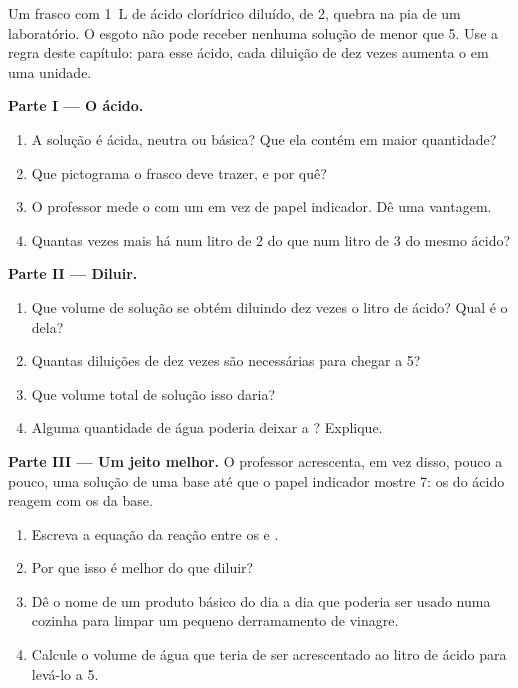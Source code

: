 \begin{problem}
\label{pb:g9:acids-bases-ph:1}
Um frasco com \qty{1}{L} de ácido clorídrico diluído, de  2, quebra na
pia de um laboratório. O esgoto não pode receber nenhuma solução de 
menor que 5. Use a regra deste capítulo: para esse ácido, cada diluição
de dez vezes aumenta o  em uma unidade.

\medskip
\noindent\textbf{Parte I --- O ácido.}
\begin{enumerate}
  \item A solução é ácida, neutra ou básica? Que  ela contém em maior
        quantidade?
  \item Que pictograma o frasco deve trazer, e por quê?
  \item O professor mede o  com um  em vez de papel indicador.
        Dê uma vantagem.
  \item Quantas vezes mais   há num litro de  2 do que num
        litro de  3 do mesmo ácido?
\end{enumerate}

\medskip
\noindent\textbf{Parte II --- Diluir.}
\begin{enumerate}[resume]
  \item Que volume de solução se obtém diluindo dez vezes o litro de
        ácido? Qual é o  dela?
  \item Quantas diluições de dez vezes são necessárias para chegar a
         5?
  \item Que volume total de solução isso daria?
  \item Alguma quantidade de água poderia deixar a ?
        Explique.
\end{enumerate}

\medskip
\noindent\textbf{Parte III --- Um jeito melhor.}
O professor acrescenta, em vez disso, pouco a pouco, uma solução de uma
base até que o papel indicador mostre 7: os   do ácido reagem
com os   da base.
\begin{enumerate}[resume]
  \item Escreva a equação da reação entre os   e .
  \item Por que isso é melhor do que diluir?
  \item Dê o nome de um produto básico do dia a dia que poderia ser usado
        numa cozinha para limpar um pequeno derramamento de vinagre.
  \item Calcule o volume de água que teria de ser acrescentado ao litro
        de ácido para levá-lo a  5.
\end{enumerate}
\end{problem}
